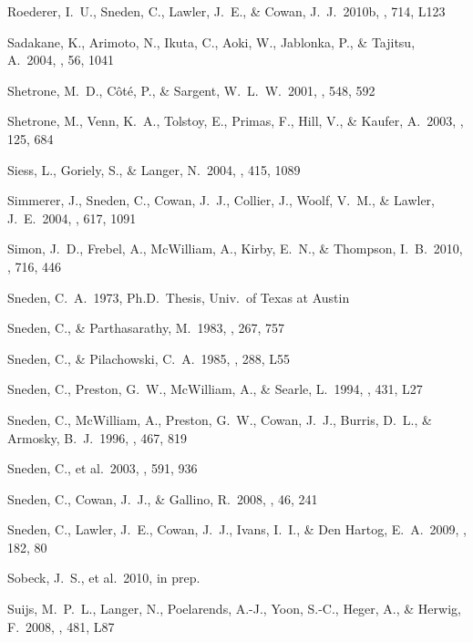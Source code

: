 \documentclass{emulateapj}
\begin{document}
\begin{thebibliography}{}
 Roederer, I.~U., Sneden, C.,
Lawler, J.~E., \& Cowan, J.~J.\ 2010b, \apj, 714, L123

 Sadakane, K., Arimoto, 
N., Ikuta, C., Aoki, W., Jablonka, P., 
\& Tajitsu, A.\ 2004, \pasj, 56, 1041 

 Shetrone, M.~D., 
C{\^o}t{\'e}, P., \& Sargent, W.~L.~W.\ 2001, \apj, 548, 592 

 Shetrone, M., Venn, 
K.~A., Tolstoy, E., Primas, F., Hill, V., 
\& Kaufer, A.\ 2003, \aj, 125, 684 

 Siess, L., Goriely, S., \& 
Langer, N.\ 2004, \aap, 415, 1089 

 Simmerer, J., Sneden, 
C., Cowan, J.~J., Collier, J., Woolf, V.~M., \& Lawler, J.~E.\ 2004, \apj, 
617, 1091 

 Simon, J.~D., Frebel, A., 
McWilliam, A., Kirby, E.~N., \& Thompson, I.~B.\ 2010, \apj, 716, 446 

 Sneden, C.~A.\ 1973, 
Ph.D.~Thesis, Univ.\ of Texas at Austin

 Sneden, C., \& 
Parthasarathy, M.\ 1983, \apj, 267, 757 

 Sneden, C., \& 
Pilachowski, C.~A.\ 1985, \apjl, 288, L55 

 Sneden, C., Preston, 
G.~W., McWilliam, A., \& Searle, L.\ 1994, \apjl, 431, L27 

 Sneden, C., McWilliam, 
A., Preston, G.~W., Cowan, J.~J., Burris, D.~L., 
\& Armosky, B.~J.\ 1996, \apj, 467, 819 

 Sneden, C., et al.\ 
2003, \apj, 591, 936 

 Sneden, C., Cowan, J.~J., \& 
Gallino, R.\ 2008, \araa, 46, 241 

 Sneden, C., Lawler, J.~E., 
Cowan, J.~J., Ivans, I.~I., \& Den Hartog, E.~A.\ 2009, \apjs, 182, 80 

 Sobeck, J.~S., et al.\ 2010, 
in prep.

 Suijs, M.~P.~L., Langer, N., 
Poelarends, A.-J., Yoon, S.-C., Heger, A., \& Herwig, F.\ 2008, \aap, 
481, L87 


\end{thebibliography}
\end{document}
